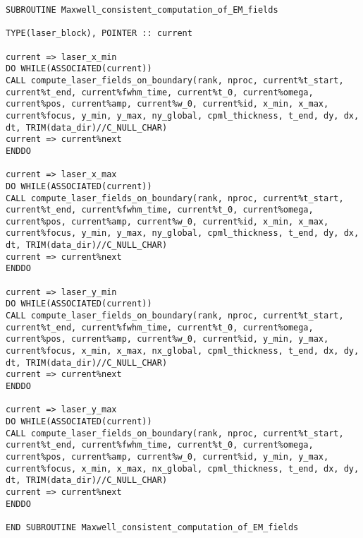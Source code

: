 \begin{lstlisting}[style=FORTRAN, caption=Fortran subroutines for Maxwell consistent computation of laser fields on boundaries]
SUBROUTINE Maxwell_consistent_computation_of_EM_fields

TYPE(laser_block), POINTER :: current

current => laser_x_min
DO WHILE(ASSOCIATED(current))
CALL compute_laser_fields_on_boundary(rank, nproc, current%t_start, current%t_end, current%fwhm_time, current%t_0, current%omega, current%pos, current%amp, current%w_0, current%id, x_min, x_max, current%focus, y_min, y_max, ny_global, cpml_thickness, t_end, dy, dx, dt, TRIM(data_dir)//C_NULL_CHAR)
current => current%next
ENDDO

current => laser_x_max
DO WHILE(ASSOCIATED(current))
CALL compute_laser_fields_on_boundary(rank, nproc, current%t_start, current%t_end, current%fwhm_time, current%t_0, current%omega, current%pos, current%amp, current%w_0, current%id, x_min, x_max, current%focus, y_min, y_max, ny_global, cpml_thickness, t_end, dy, dx, dt, TRIM(data_dir)//C_NULL_CHAR)
current => current%next
ENDDO

current => laser_y_min
DO WHILE(ASSOCIATED(current))
CALL compute_laser_fields_on_boundary(rank, nproc, current%t_start, current%t_end, current%fwhm_time, current%t_0, current%omega, current%pos, current%amp, current%w_0, current%id, y_min, y_max, current%focus, x_min, x_max, nx_global, cpml_thickness, t_end, dx, dy, dt, TRIM(data_dir)//C_NULL_CHAR)
current => current%next
ENDDO

current => laser_y_max
DO WHILE(ASSOCIATED(current))
CALL compute_laser_fields_on_boundary(rank, nproc, current%t_start, current%t_end, current%fwhm_time, current%t_0, current%omega, current%pos, current%amp, current%w_0, current%id, y_min, y_max, current%focus, x_min, x_max, nx_global, cpml_thickness, t_end, dx, dy, dt, TRIM(data_dir)//C_NULL_CHAR)
current => current%next
ENDDO

END SUBROUTINE Maxwell_consistent_computation_of_EM_fields
\end{lstlisting}


